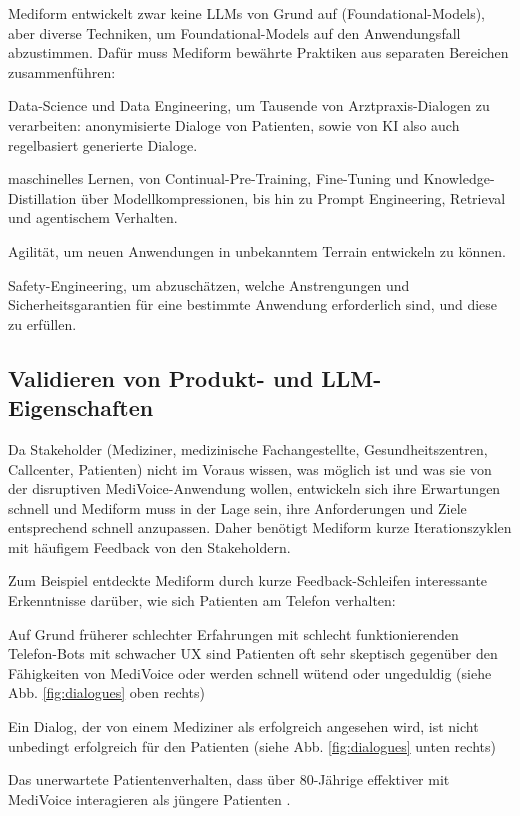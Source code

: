 \documentclass[twocolumn]{article}
\begin{document}
Mediform entwickelt zwar keine LLMs von Grund auf (Foundational-Models), aber diverse Techniken,
um Foundational-Models auf den Anwendungsfall abzustimmen.
Dafür muss Mediform bewährte Praktiken aus separaten Bereichen zusammenführen:
\begin{compactitem}
\item Data-Science und Data Engineering, um Tausende von Arztpraxis-Dialogen zu verarbeiten: anonymisierte Dialoge von Patienten, sowie von KI also auch regelbasiert generierte Dialoge.
\item maschinelles Lernen, von Continual-Pre-Training, Fine-Tuning und Knowledge-Distillation über Modellkompressionen, bis hin zu Prompt Engineering, Retrieval und agentischem Verhalten.
\item Agilität, um neuen Anwendungen in unbekanntem Terrain entwickeln zu können.
\item Safety-Engineering, um abzuschätzen, welche Anstrengungen und Sicherheitsgarantien für eine bestimmte Anwendung erforderlich sind, und diese zu erfüllen.
\end{compactitem}

\subsection{Validieren von Produkt- und LLM-Eigenschaften}

Da Stakeholder (Mediziner, medizinische Fachangestellte, Gesundheitszentren, Callcenter, Patienten) nicht im Voraus wissen, was möglich ist und was sie von der disruptiven MediVoice-Anwendung wollen, entwickeln sich ihre Erwartungen schnell und Mediform muss in der Lage sein, ihre Anforderungen und Ziele entsprechend schnell anzupassen. Daher benötigt Mediform kurze Iterationszyklen mit häufigem Feedback von den Stakeholdern.

Zum Beispiel entdeckte Mediform durch kurze Feedback-Schleifen interessante Erkenntnisse darüber, wie sich Patienten am Telefon verhalten:
\begin{compactitem}
\item Auf Grund früherer schlechter Erfahrungen mit schlecht funktionierenden Telefon-Bots mit schwacher UX sind Patienten oft sehr skeptisch gegenüber den Fähigkeiten von MediVoice oder werden schnell wütend oder ungeduldig  (siehe Abb. \ref{fig:dialogues} oben rechts)
\item Ein Dialog, der von einem Mediziner als erfolgreich angesehen wird, ist nicht unbedingt erfolgreich für den Patienten (siehe Abb. \ref{fig:dialogues} unten rechts)
\item Das unerwartete Patientenverhalten, dass über 80-Jährige effektiver mit MediVoice interagieren als jüngere Patienten \cite{Mediform24}.
\end{compactitem}
\end{document}
